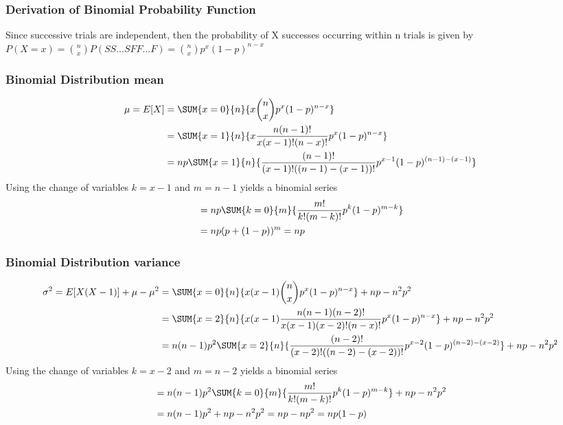 \documentclass[10pt,]{book}
\theoremstyle{plain}
\theoremstyle{definition}
\theoremstyle{definition}
\numberwithin{equation}{section}
\begin{document}
\subsubsection[Derivation of Binomial Probability Function]{Derivation of Binomial Probability Function}\label{subsection-12}
 Since successive trials are independent, then the probability of X successes occurring within n 
			trials is given by 
			\(P(X=x) = \binom{n}{x}P(SS...SFF...F) = \binom{n}{x}p^x(1-p)^{n-x}\)%
\typeout{************************************************}
\typeout{************************************************}
\subsubsection[Binomial Distribution mean]{Binomial Distribution mean}\label{subsection-13}
\begin{align*}
 \mu = E[X] & = \SUM {x=0} {n} {x \binom{n}{x} p^x (1-p)^{n-x}}\\
 & = \SUM {x=1} {n} {x \frac{n(n-1)!}{x(x-1)!(n-x)!} p^x (1-p)^{n-x}}\\
 & = np \SUM {x=1} {n} {\frac{(n-1)!}{(x-1)!((n-1)-(x-1))!} p^{x-1} (1-p)^{(n-1)-(x-1)}}
\end{align*}Using the change of variables \(k=x-1\) and \(m = n-1\) yields a binomial series%
\begin{align*}
 & = np \SUM {k=0} {m} {\frac{m!}{k!(m-k)!} p^k (1-p)^{m-k}}\\
 & = np (p + (1-p))^m = np
\end{align*}\typeout{************************************************}
\typeout{************************************************}
\subsubsection[Binomial Distribution variance]{Binomial Distribution variance}\label{subsection-14}
\begin{align*}
 \sigma^2 = E[X(X-1)] + \mu - \mu^2 & = \SUM {x=0} {n} {x(x-1) \binom{n}{x} p^x (1-p)^{n-x}} + np - n^2p^2\\
 & = \SUM {x=2} {n} {x(x-1) \frac{n(n-1)(n-2)!}{x(x-1)(x-2)!(n-x)!} p^x (1-p)^{n-x}}  + np - n^2p^2\\
 & = n(n-1)p^2 \SUM {x=2} {n} {\frac{(n-2)!}{(x-2)!((n-2)-(x-2))!} p^{x-2} (1-p)^{(n-2)-(x-2)}} + np - n^2p^2
\end{align*}Using the change of variables \(k=x-2\) and \(m = n-2\) yields a binomial series%
\begin{align*}
 & = n(n-1)p^2  \SUM {k=0} {m} {\frac{m!}{k!(m-k)!} p^k (1-p)^{m-k}} + np - n^2p^2\\
 & = n(n-1)p^2 + np - n^2p^2 = np - np^2 = np(1-p)
\end{align*}\typeout{************************************************}
\typeout{************************************************}
\end{document}
